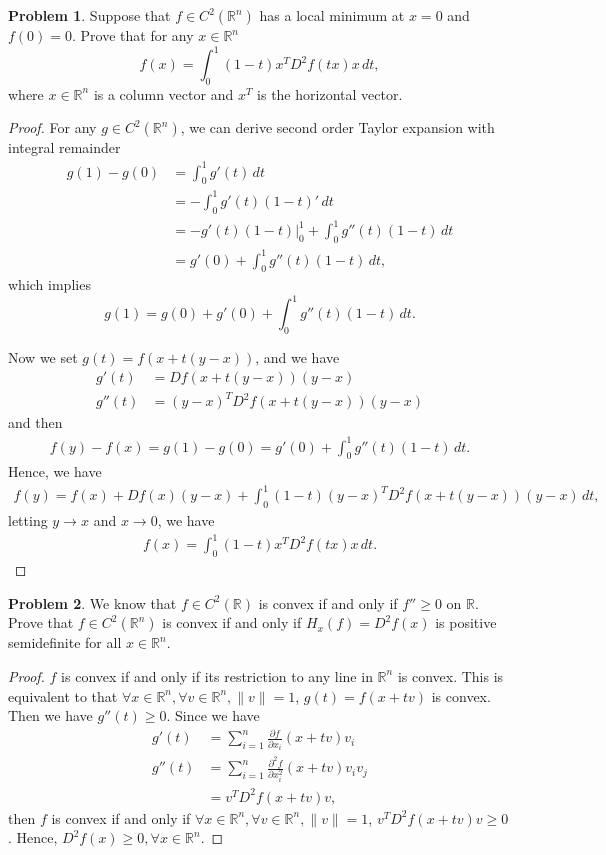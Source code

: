 \documentclass[11pt]{article}
\theoremstyle{definition}
\newtheorem{problem}{Problem}
\theoremstyle{definition}
\begin{document}
\begin{problem}\label{problem_38}
Suppose that $f\in C^2(\mathbb{R}^n)$ has a local minimum at $x=0$ and $f(0)=0$. Prove that for any $x\in\mathbb{R}^n$
$$
f(x)=\int_0^1 (1-t)x^TD^2f(tx)x\, dt,
$$
where $x\in\mathbb{R}^n$ is a column vector and $x^T$ is the horizontal vector.
\end{problem}
\begin{proof}
For any $g\in C^2(\mathbb{R}^n)$, we can derive second order Taylor expansion with integral remainder 
\begin{align*}
    g(1) - g(0) & = \int^1_0 g'(t)\, dt \\
    & = - \int^1_0 g'(t)(1-t)'\, dt \\
    & = -g'(t)(1-t)\Big|^1_0 + \int^1_0 g''(t)(1-t)\, dt \\
    & = g'(0) + \int^1_0 g''(t)(1-t)\, dt, 
\end{align*}
which implies $$g(1) = g(0) + g'(0) + \int^1_0 g''(t)(1-t)\, dt.$$ 

Now we set $g(t) = f(x+t(y-x))$, and we have 
\begin{align*}
    g'(t) & = Df(x+t(y-x)) (y-x) \\
    g''(t) & = (y-x)^T D^2 f(x+t(y-x)) (y-x)
\end{align*}
and then 
\begin{align*}
    f(y) - f(x) = g(1) - g(0) = g'(0) + \int^1_0 g''(t)(1-t)\, dt.
\end{align*}
Hence, we have
\begin{align*}
    f(y) = f(x) + Df(x)(y-x) + \int^1_0 (1-t) (y-x)^T D^2 f(x+t(y-x)) (y-x)\, dt,
\end{align*}
letting $y\to x$ and $x\to 0$, we have
\begin{align*}
    f(x) = \int_0^1 (1-t)x^T D^2f(tx) x\, dt.
\end{align*}
\end{proof}

\medskip

\begin{problem}
We know that $f\in C^2(\mathbb{R})$ is convex if and only if $f''\geq 0$ on $\mathbb{R}$. Prove that $f\in C^2(\mathbb{R}^n)$ is convex if and only if
$H_x(f)=D^2f(x)$ is positive semidefinite for all $x\in\mathbb{R}^n$.
\end{problem}
\begin{proof}
$f$ is convex if and only if its restriction to any line in $\mathbb{R}^n$ is convex. This is equivalent to that $\forall x\in \mathbb{R}^n, \forall v \in \mathbb{R}^n, \|v\| = 1$, $g(t) = f(x+tv)$ is convex. Then we have $g''(t) \geq 0$. Since we have 
\begin{align*}
    g'(t) & = \sum^n_{i=1} \frac{\partial f}{\partial x_i}(x+tv) v_i \\
    g''(t) & = \sum^n_{i=1} \frac{\partial^2 f}{\partial x_i^2}(x+tv) v_i v_j\\
    & = v^T D^2f(x+tv)v,
\end{align*}
then $f$ is convex if and only if $\forall x\in \mathbb{R}^n, \forall v \in \mathbb{R}^n, \|v\| = 1$, $v^T D^2f(x+tv)v \geq 0$. Hence, $D^2f(x) \geq 0, \forall x \in \mathbb{R}^n$.
\end{proof}
\end{document}
